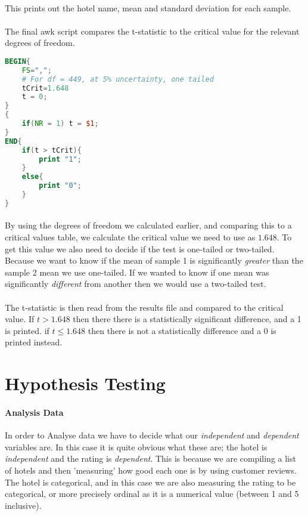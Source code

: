 \documentclass[10pt]{article}
\begin{document}
\paragraph{}
This prints out the hotel name, mean and standard deviation for each sample.
\paragraph{}
The final awk script compares the t-statistic to the critical value for the relevant degrees of freedom.
\begin{lstlisting}[language=awk]
BEGIN{
	FS=",";
	# For df = 449, at 5% uncertainty, one tailed
	tCrit=1.648 
	t = 0;
}
{
	if(NR = 1) t = $1;
}
END{
	if(t > tCrit){
		print "1";
	}
	else{
		print "0";
	}
}
\end{lstlisting}
\paragraph{}
By using the degrees of freedom we calculated earlier, and comparing this to a critical values table, we calculate the critical value we need to use as $1.648$. To get this value we also need to decide if the test is one-tailed or two-tailed. Because we want to know if the mean of sample 1 is significantly \textit{greater} than the sample 2 mean we use one-tailed. If we wanted to know if one mean was significantly \textit{different} from another then we would use a two-tailed test.
\paragraph{}
The t-statistic is then read from the results file and compared to the critical value. If $t > 1.648$ then there there is a statistically significant difference, and a 1 is printed. if $t \leq 1.648$ then there is not a statistically difference and a 0 is printed instead.

\section{Hypothesis Testing}
\paragraph{Analysis Data}
In order to Analyse data we have to decide what our \textit{independent} and \textit{dependent} variables are. In this case it is quite obvious what these are; the hotel is \textit{independent} and the rating is \textit{dependent}. This is because we are compiling a list of hotels and then 'measuring' how good each one is by using customer reviews. The hotel is categorical, and in this case we are also measuring the rating to be categorical, or more precisely ordinal as it is a numerical value (between 1 and 5 inclusive).
\end{document}
